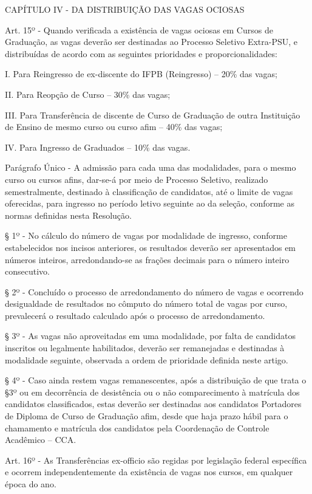 CAPÍTULO IV - DA DISTRIBUIÇÃO DAS VAGAS OCIOSAS


Art. 15º - Quando verificada a existência de vagas ociosas em Cursos de Graduação, as vagas deverão ser destinadas ao Processo Seletivo Extra-PSU, e distribuídas de acordo com as seguintes prioridades e proporcionalidades:

I. Para Reingresso de ex-discente do IFPB (Reingresso) – 20\% das vagas;

II. Para Reopção de Curso – 30\% das vagas;

III. Para Transferência de discente de Curso de Graduação de outra Instituição de Ensino de mesmo curso ou curso afim – 40\% das vagas;

IV. Para Ingresso de Graduados – 10\% das vagas.

Parágrafo Único - A admissão para cada uma das modalidades, para o mesmo curso ou cursos afins, dar-se-á por meio de Processo Seletivo, realizado semestralmente, destinado à classificação de candidatos, até o limite de vagas oferecidas, para ingresso no período letivo seguinte ao da seleção, conforme as normas definidas nesta Resolução.

§ 1º - No cálculo do número de vagas por modalidade de ingresso, conforme estabelecidos nos incisos anteriores, os resultados deverão ser apresentados em números inteiros, arredondando-se as frações decimais para o número inteiro consecutivo.

§ 2º - Concluído o processo de arredondamento do número de vagas e ocorrendo desigualdade de resultados no cômputo do número total de vagas por curso, prevalecerá o resultado calculado após o processo de arredondamento.

§ 3º - As vagas não aproveitadas em uma modalidade, por falta de candidatos inscritos ou legalmente habilitados, deverão ser remanejadas e destinadas à modalidade seguinte, observada a ordem de prioridade definida neste artigo.

§ 4º - Caso ainda restem vagas remanescentes, após a distribuição de que trata o §3º ou em decorrência de desistência ou o não comparecimento à matrícula dos candidatos classificados, estas deverão ser destinadas aos candidatos Portadores de Diploma de Curso de Graduação afim, desde que haja prazo hábil para o chamamento e matrícula dos candidatos pela Coordenação de Controle Acadêmico – CCA.

\vspace{1mm}
Art. 16º - As Transferências ex-officio são regidas por legislação federal específica e ocorrem independentemente da existência de vagas nos cursos, em qualquer época do ano.


